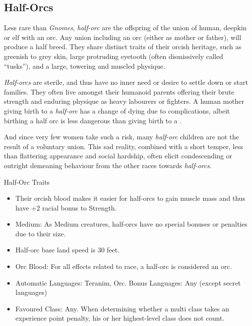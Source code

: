 \subsection{Half-Orcs}
\label{sec:Half-Orcs}

Less rare than \emph{Gnomes}, \emph{half-orc} are the offspring of the union
of human, deepkin or elf with an orc. Any union including an orc (either as
mother or father), will produce a half breed. They share distinct traits of
their orcish heritage, such as greenish to grey skin, large protruding
eyetooth (often dismissively called ``tusks''), and a large, towering and
muscled physique.

\emph{Half-orcs} are sterile, and thus have no inner need or desire to settle
down or start families. They often live amongst their humanoid parents
offering their brute strength and enduring physique as heavy labourers or
fighters. A human mother giving birth to a \emph{half-orc} has a change of
dying due to complications, albeit birthing a half orc is less dangerous than
giving birth to a .

And since very few women take such a risk, many \emph{half-orc} children are
not the result of a voluntary union. This sad reality, combined with a short
temper, less than flattering appearance and social hardship, often elicit
condescending or outright demeaning behaviour from the other races towards
\emph{half-orcs}.

\begin{35e}{Half-Orc Traits}
  \begin{itemize}[noitemsep]
    \item Their orcish blood makes it easier for half-orcs to gain muscle mass
      and thus have +2 racial bonus to Strength.
    \item Medium: As Medium creatures, half-orcs have no special bonuses or
      penalties due to their size.
    \item Half-orc base land speed is 30 feet.
    \item Orc Blood: For all effects related to race, a half-orc is considered
    an orc.
    \item Automatic Languages: Teranim, Orc. Bonus Languages: Any (except secret
      languages)
    \item Favoured Class: Any. When determining whether a multi class takes an
    experience point penalty, his or her highest-level class does not count.
  \end{itemize}
\end{35e}
